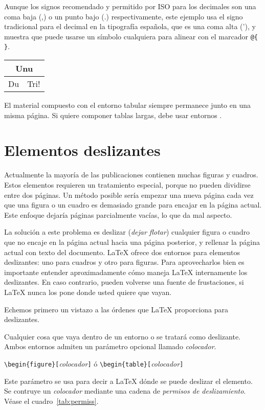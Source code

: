 Aunque los signos recomendado y permitido por ISO para los decimales son una coma baja (,) o un punto bajo (.) respectivamente, este ejemplo usa el signo tradicional para el decimal en la tipografía española, que es una coma alta ('), y muestra que puede usarse un símbolo cualquiera para alinear con el marcador \verb=@{ }=.

\begin{example}
\begin{tabular}{|c|c|}
\hline
\multicolumn{2}{|c|}{Unu} \\
\hline
Du & Tri! \\
\hline
\end{tabular}
\end{example}

El material compuesto con el entorno tabular siempre permanece junto en una misma página.  Si quiere componer tablas largas, debe usar entornos .

\section{Elementos deslizantes}

Actualmente la mayoría de las publicaciones contienen muchas figuras y cuadros.  Estos elementos requieren un tratamiento especial, porque no pueden dividirse entre dos páginas.  Un método posible sería empezar una nueva página cada vez que una figura o un cuadro es demasiado grande para encajar en la página actual.  Este enfoque dejaría páginas parcialmente vacías, lo que da mal aspecto.

La solución a este problema es deslizar (\emph{dejar flotar}) cualquier figura o cuadro que no encaje en la página actual hacia una página posterior, y rellenar la página actual con texto del documento. \LaTeX{} ofrece dos entornos para elementos deslizantes:  uno para cuadros y otro para figuras. Para aprovecharlos bien es importante entender aproximadamente cómo maneja \LaTeX{} internamente los deslizantes.  En caso contrario, pueden volverse una fuente de frustaciones, si \LaTeX{} nunca los pone donde usted quiere que vayan.

Echemos primero un vistazo a las órdenes que \LaTeX{} proporciona para deslizantes.

Cualquier cosa que vaya dentro de un entorno  o  se tratará como deslizante.  Ambos entornos admiten un parámetro opcional llamado \emph{colocador}.
\begin{lscommand}
\verb|\begin{figure}[|\emph{colocador}\verb|]| ó
\verb|\begin{table}[|\emph{colocador}\verb|]|
\end{lscommand}
Este parámetro se usa para decir a \LaTeX{} dónde se puede deslizar el elemento.  Se contruye un \emph{colocador} mediante una cadena de \emph{permisos de deslizamiento}. Véase el cuadro~\ref{tab:permiss}.

